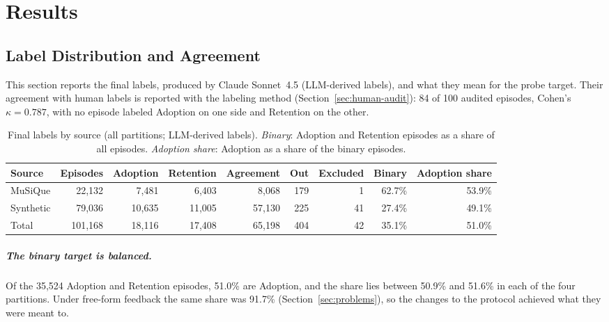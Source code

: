 \chapter{Results}

\section{Label Distribution and Agreement}
\label{sec:results-labels}

This section reports the final labels, produced by Claude Sonnet~4.5
(LLM-derived labels), and what they mean for the probe target. Their agreement
with human labels is reported with the labeling method
(Section~\ref{sec:human-audit}): 84 of 100 audited episodes, Cohen's
$\kappa = 0.787$, with no episode labeled Adoption on one side and Retention on
the other.

\begin{table}[htbp]
    \centering
    \caption{Final labels by source (all partitions; LLM-derived labels).
    \emph{Binary}: Adoption and Retention episodes as a share of all episodes.
    \emph{Adoption share}: Adoption as a share of the binary episodes.}
    \label{tab:final-labels}
    \small
    \setlength{\tabcolsep}{4pt}
    \begin{tabular}{lrrrrrrrr}
        \toprule
        Source & Episodes & Adoption & Retention & Agreement & Out & Excluded & Binary & Adoption share \\
        \midrule
        MuSiQue   & 22,132  & 7,481  & 6,403  & 8,068  & 179 & 1  & 62.7\% & 53.9\% \\
        Synthetic & 79,036  & 10,635 & 11,005 & 57,130 & 225 & 41 & 27.4\% & 49.1\% \\
        \midrule
        Total     & 101,168 & 18,116 & 17,408 & 65,198 & 404 & 42 & 35.1\% & 51.0\% \\
        \bottomrule
    \end{tabular}
\end{table}

\paragraph{The binary target is balanced.} Of the 35,524 Adoption and
Retention episodes, 51.0\% are Adoption, and the share lies between 50.9\% and
51.6\% in each of the four partitions. Under free-form feedback the same share
was 91.7\% (Section~\ref{sec:problems}), so the changes to the protocol
achieved what they were meant to.

